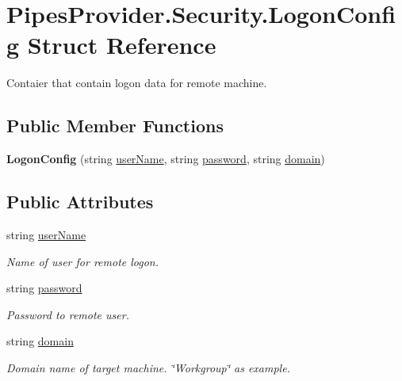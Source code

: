 \hypertarget{struct_pipes_provider_1_1_security_1_1_logon_config}{}\section{Pipes\+Provider.\+Security.\+Logon\+Config Struct Reference}
\label{struct_pipes_provider_1_1_security_1_1_logon_config}


Contaier that contain logon data for remote machine.  


\subsection*{Public Member Functions}
\begin{DoxyCompactItemize}
\item 
\mbox{\label{struct_pipes_provider_1_1_security_1_1_logon_config_a9a7976747dbec231bbb598bc69a84274}} 
{\bfseries Logon\+Config} (string \mbox{\hyperlink{struct_pipes_provider_1_1_security_1_1_logon_config_ad9d68ef23dc614044127aaa54c901a05}{user\+Name}}, string \mbox{\hyperlink{struct_pipes_provider_1_1_security_1_1_logon_config_a897f10d6a83aa90807de0571d4f5a99d}{password}}, string \mbox{\hyperlink{struct_pipes_provider_1_1_security_1_1_logon_config_a65f053075525de0b032d76a1ac733059}{domain}})
\end{DoxyCompactItemize}
\subsection*{Public Attributes}
\begin{DoxyCompactItemize}
\item 
string \mbox{\hyperlink{struct_pipes_provider_1_1_security_1_1_logon_config_ad9d68ef23dc614044127aaa54c901a05}{user\+Name}}
\begin{DoxyCompactList}\small\item\em Name of user for remote logon. \end{DoxyCompactList}\item 
string \mbox{\hyperlink{struct_pipes_provider_1_1_security_1_1_logon_config_a897f10d6a83aa90807de0571d4f5a99d}{password}}
\begin{DoxyCompactList}\small\item\em Password to remote user. \end{DoxyCompactList}\item 
string \mbox{\hyperlink{struct_pipes_provider_1_1_security_1_1_logon_config_a65f053075525de0b032d76a1ac733059}{domain}}
\begin{DoxyCompactList}\small\item\em Domain name of target machine. \char`\"{}\+Workgroup\char`\"{} as example. \end{DoxyCompactList}\end{DoxyCompactItemize}
